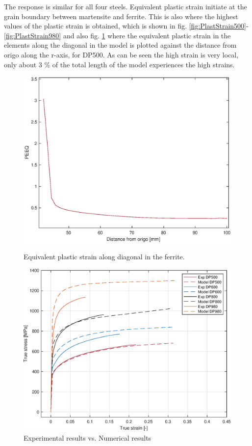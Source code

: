 \documentclass{article}
\begin{document}
The response is similar for all four steels. Equivalent plastic strain initiate at the grain boundary between martensite and ferrite. This is also where the highest values of the plastic strain is obtained, which is shown in fig. \ref{fig:PlastStrain500}- \ref{fig:PlastStrain980} and also fig. \ref{fig:PEEQvsDist} where the equivalent plastic strain in the elements along the diagonal in the model is plotted against the distance from origo along the r-axis, for DP500. As can be seen the high strain is very local, only about 3 \% of the total length of the model experiences the high strains.



\begin{figure}[!h]
  \centering
  \begin{minipage}[b]{0.4\textwidth}
    \includegraphics[width=\textwidth]{PEEQvsDist.eps}
    \caption{Equivalent plastic strain along diagonal in the ferrite. }
    \label{fig:PEEQvsDist}
  \end{minipage}
  \hfill
  \begin{minipage}[b]{0.4\textwidth}
    \includegraphics[width=\textwidth]{MeanMean.eps}
    \caption{Experimental results vs. Numerical results}
  \end{minipage}
\end{figure}
\end{document}
